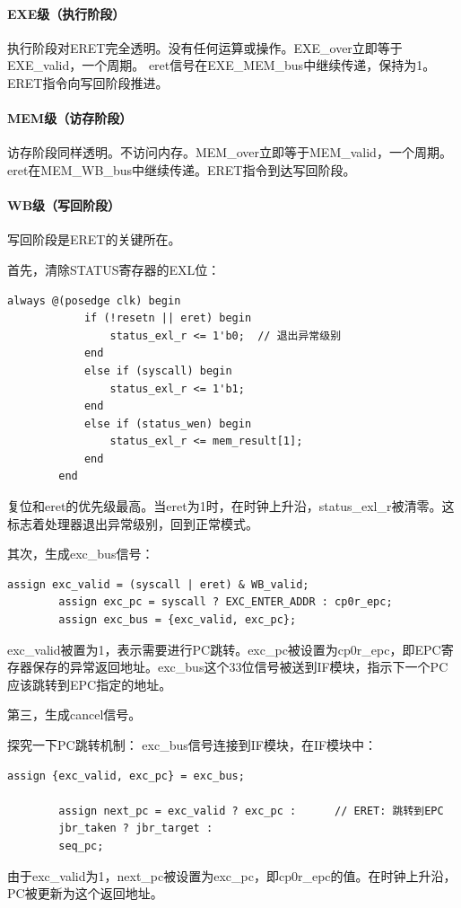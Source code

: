 \documentclass[a4paper]{article}
\begin{document}
	\paragraph{EXE级（执行阶段）}
	执行阶段对ERET完全透明。没有任何运算或操作。EXE\_over立即等于EXE\_valid，一个周期。
	eret信号在EXE\_MEM\_bus中继续传递，保持为1。ERET指令向写回阶段推进。
	\paragraph{MEM级（访存阶段）}
	访存阶段同样透明。不访问内存。MEM\_over立即等于MEM\_valid，一个周期。
	eret在MEM\_WB\_bus中继续传递。ERET指令到达写回阶段。
	\paragraph{WB级（写回阶段）}
	写回阶段是ERET的关键所在。
	
	首先，清除STATUS寄存器的EXL位：
	\begin{lstlisting}[caption={WB-exl}]
		always @(posedge clk) begin
			if (!resetn || eret) begin
				status_exl_r <= 1'b0;  // 退出异常级别
			end
			else if (syscall) begin
				status_exl_r <= 1'b1;
			end
			else if (status_wen) begin
				status_exl_r <= mem_result[1];
			end
		end
	\end{lstlisting}
	复位和eret的优先级最高。当eret为1时，在时钟上升沿，status\_exl\_r被清零。这标志着处理器退出异常级别，回到正常模式。
	
	其次，生成exc\_bus信号：
	\begin{lstlisting}[caption={WB-excbus}]
		assign exc_valid = (syscall | eret) & WB_valid;
		assign exc_pc = syscall ? EXC_ENTER_ADDR : cp0r_epc;
		assign exc_bus = {exc_valid, exc_pc};
	\end{lstlisting}
	exc\_valid被置为1，表示需要进行PC跳转。exc\_pc被设置为cp0r\_epc，即EPC寄存器保存的异常返回地址。exc\_bus这个33位信号被送到IF模块，指示下一个PC应该跳转到EPC指定的地址。
	
	第三，生成cancel信号。
	
	探究一下PC跳转机制：
	exc\_bus信号连接到IF模块，在IF模块中：
	\begin{lstlisting}[caption={WB-PCskip}]
		assign {exc_valid, exc_pc} = exc_bus;
		
		assign next_pc = exc_valid ? exc_pc :      // ERET: 跳转到EPC
		jbr_taken ? jbr_target :
		seq_pc;
	\end{lstlisting}
	由于exc\_valid为1，next\_pc被设置为exc\_pc，即cp0r\_epc的值。在时钟上升沿，PC被更新为这个返回地址。
	
\end{document}
